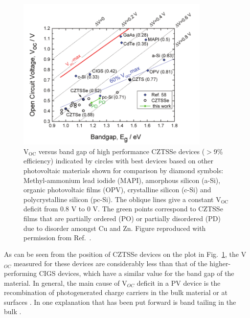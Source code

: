 \documentclass[11pt, twoside]{report}
\begin{document}
\begin{figure}[h!]
  \centering
    \includegraphics[width=0.85\textwidth]{figures/Voc.png}
    \caption[V$_{\mathrm{OC}}$ versus band gap of high performance CZTSSe devices ($>$9\% efficiency) indicated by circles with best devices based on other photovoltaic materials shown for comparison by diamond symbols: Methyl-ammonium lead iodide (MAPI), amorphous silicon (a-Si), organic photovoltaic films (OPV), crystalline silicon (c-Si) and polycrystalline silicon (pc-Si). The oblique lines give a constant V$_{\mathrm{OC}}$ deficit from 0.8 V to 0 V. The green points correspond to CZTSSe films that are partially ordered (PO) or partially disordered (PD) due to disorder amongst Cu and Zn.]{V$_{\mathrm{OC}}$ versus band gap of high performance CZTSSe devices ($>$9\% efficiency) indicated by circles with best devices based on other photovoltaic materials shown for comparison by diamond symbols: Methyl-ammonium lead iodide (MAPI), amorphous silicon (a-Si), organic photovoltaic films (OPV), crystalline silicon (c-Si) and polycrystalline silicon (pc-Si). The oblique lines give a constant V$_{\mathrm{OC}}$ deficit from 0.8 V to 0 V. The green points correspond to CZTSSe films that are partially ordered (PO) or partially disordered (PD) due to disorder amongst Cu and Zn. Figure reproduced with permission from Ref.~.}
  \label{Voc}
\end{figure}

As can be seen from the position of CZTSSe devices on the plot in Fig.~\ref{Voc}, the V$_{OC}$ measured for these devices are considerably less than that of the higher-performing CIGS devices, which have a similar value for the band gap of the material.
In general, the main cause of V$_{OC}$ deficit in a PV device is the recombination of photogenerated charge carriers in the bulk material or at surfaces \cite{culprit}. In {\CZTS} one explanation that has been put forward is band tailing in the bulk \cite{band_tail}.
\end{document}
